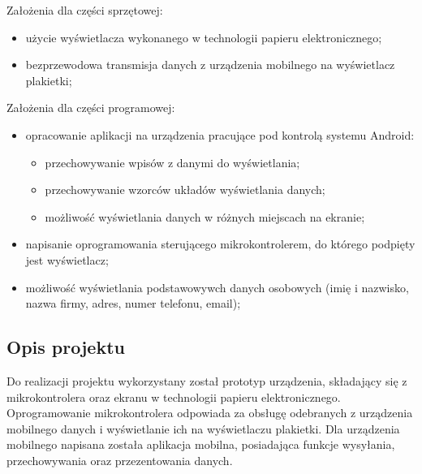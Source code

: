 \documentclass[a4paper,12pt, twoside]{article}
\begin{document}
    	\begin{flushleft} Założenia dla części sprzętowej:
    	\begin{itemize}
    		\item użycie wyświetlacza wykonanego w technologii papieru elektronicznego;
    		\item bezprzewodowa transmisja danych z urządzenia mobilnego na wyświetlacz plakietki;
    	\end{itemize}
    	
    	\vspace{.5cm}
    	Założenia dla części programowej:
    	\begin{itemize}
    		\item opracowanie aplikacji na urządzenia pracujące pod kontrolą systemu Android:
    		\begin{itemize}
    		    \item przechowywanie wpisów z danymi do wyświetlania;
    		    \item przechowywanie wzorców układów wyświetlania danych;
    		    \item możliwość wyświetlania danych w różnych miejscach na ekranie;
    		\end{itemize}
    		\item napisanie oprogramowania sterującego mikrokontrolerem, do którego podpięty jest wyświetlacz;
    		\item możliwość wyświetlania podstawowywch danych osobowych (imię i nazwisko, nazwa firmy, adres, numer telefonu, email);
    	\end{itemize}
    	\end{flushleft}
    	
    	\subsection{Opis projektu}
    	Do realizacji projektu wykorzystany został prototyp urządzenia, składający się z mikrokontrolera oraz ekranu w technologii papieru elektronicznego. Oprogramowanie mikrokontrolera odpowiada za obsługę odebranych z urządzenia mobilnego danych i wyświetlanie ich na wyświetlaczu plakietki. Dla urządzenia mobilnego napisana została aplikacja mobilna, posiadająca funkcje wysyłania, przechowywania oraz przezentowania danych.
    	
    	
\end{document}
